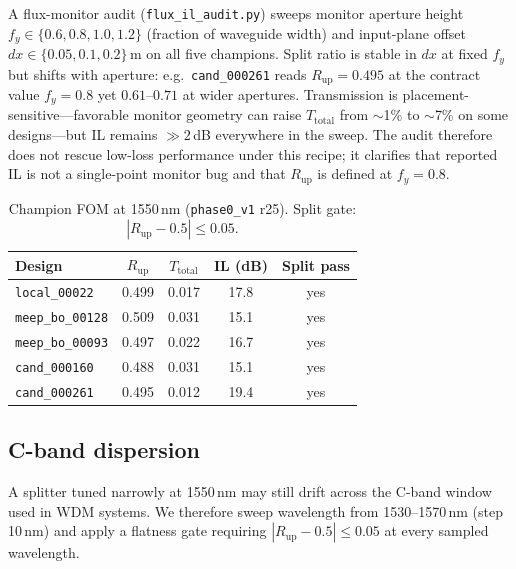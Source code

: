\documentclass[11pt,a4paper]{article}
\begin{document}
A flux-monitor audit (\texttt{flux\_il\_audit.py}) sweeps monitor aperture height $f_y \in \{0.6,0.8,1.0,1.2\}$ (fraction of waveguide width) and input-plane offset $dx \in \{0.05,0.1,0.2\}$\,\textmu m on all five champions.
Split ratio is stable in $dx$ at fixed $f_y$ but shifts with aperture: e.g.\ \texttt{cand\_000261} reads $R_{\mathrm{up}}=0.495$ at the contract value $f_y{=}0.8$ yet $0.61$--$0.71$ at wider apertures.
Transmission is placement-sensitive---favorable monitor geometry can raise $T_{\mathrm{total}}$ from $\sim$1\% to $\sim$7\% on some designs---but IL remains $\gg 2$\,dB everywhere in the sweep.
The audit therefore does not rescue low-loss performance under this recipe; it clarifies that reported IL is not a single-point monitor bug and that $R_{\mathrm{up}}$ is defined at $f_y{=}0.8$.

\begin{table}[t]
  \centering
  \caption{Champion FOM at 1550\,nm (\texttt{phase0\_v1} r25). Split gate: $|R_{\mathrm{up}}-0.5|\le 0.05$.}
  \label{tab:champion_fom}
  \begin{tabular}{lcccc}
    \toprule
    Design & $R_{\mathrm{up}}$ & $T_{\mathrm{total}}$ & IL (dB) & Split pass \\
    \midrule
    \texttt{local\_00022} & 0.499 & 0.017 & 17.8 & yes \\
    \texttt{meep\_bo\_00128} & 0.509 & 0.031 & 15.1 & yes \\
    \texttt{meep\_bo\_00093} & 0.497 & 0.022 & 16.7 & yes \\
    \texttt{cand\_000160} & 0.488 & 0.031 & 15.1 & yes \\
    \texttt{cand\_000261} & 0.495 & 0.012 & 19.4 & yes \\
    \bottomrule
  \end{tabular}
\end{table}

\subsection{C-band dispersion}

A splitter tuned narrowly at 1550\,nm may still drift across the C-band window used in WDM systems.
We therefore sweep wavelength from 1530--1570\,nm (step 10\,nm) and apply a flatness gate requiring $|R_{\mathrm{up}}-0.5|\le 0.05$ at every sampled wavelength.
\end{document}

